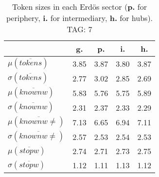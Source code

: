 \begin{table}[h!]
\begin{center}
\begin{tabular}{| l || c | c | c | c |}\hline
 & {\bf g.} & {\bf p.} & {\bf i.} & {\bf h.} \\\hline\hline
$\mu(\overline{tokens})$ & 3.85  & 3.87  & 3.80  & 3.87 \\
$\sigma(\overline{tokens})$ & 2.77  & 3.02  & 2.85  & 2.69 \\\hline
$\mu(\overline{knownw})$ & 5.83  & 5.76  & 5.75  & 5.89 \\
$\sigma(\overline{knownw})$ & 2.31  & 2.37  & 2.33  & 2.29 \\\hline
$\mu(\overline{knownw \neq})$ & 7.13  & 6.65  & 6.94  & 7.11 \\
$\sigma(\overline{knownw \neq})$ & 2.57  & 2.53  & 2.54  & 2.53 \\\hline
$\mu(\overline{stopw})$ & 2.74  & 2.71  & 2.73  & 2.75 \\
$\sigma(\overline{stopw})$ & 1.12  & 1.11  & 1.13  & 1.12 \\\hline
\end{tabular}
\caption{Token sizes in each Erd\"os sector ({{\bf p.}} for periphery, {{\bf i.}} for intermediary, {{\bf h.}} for hubs). TAG: 7}
\end{center}
\end{table}